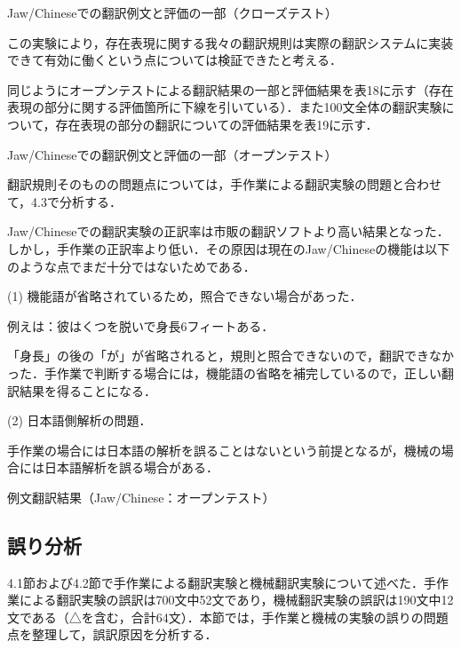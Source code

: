 \documentclass[japanese]{jnlp_1.4}
\begin{document}
\begin{table}[t]
\caption{Jaw/Chineseでの翻訳例文と評価の一部（クローズテスト）}

\end{table}


この実験により，存在表現に関する我々の翻訳規則は実際の翻訳システムに実装できて有効に働くという点については検証できたと考える．

同じようにオープンテストによる翻訳結果の一部と評価結果を表18に示す（存在表現の部分に関する評価箇所に下線を引いている）．また100文全体の翻訳実験について，存在表現の部分の翻訳についての評価結果を表19に示す．

\begin{table}[p]
\caption{Jaw/Chineseでの翻訳例文と評価の一部（オープンテスト）}

\end{table}


翻訳規則そのものの問題点については，手作業による翻訳実験の問題と合わせて，4.3で分析する．

Jaw/Chineseでの翻訳実験の正訳率は市販の翻訳ソフトより高い結果となった．しかし，手作業の正訳率より低い．その原因は現在のJaw/Chineseの機能は以下のような点でまだ十分ではないためである．

\noindent
(1) 機能語が省略されているため，照合できない場合があった．

例えは：彼はくつを脱いで身長6フィートある．

「身長」の後の「が」が省略されると，規則と照合できないので，翻訳できなかった．手作業で判断する場合には，機能語の省略を補完しているので，正しい翻訳結果を得ることになる．

\noindent
(2) 日本語側解析の問題．

手作業の場合には日本語の解析を誤ることはないという前提となるが，機械の場合には日本語解析を誤る場合がある．

\begin{table}[t]
\caption{例文翻訳結果（Jaw/Chinese：オープンテスト）}

\end{table}


\subsection{誤り分析}

4.1節および4.2節で手作業による翻訳実験と機械翻訳実験について述べた．手作業による翻訳実験の誤訳は700文中52文であり，機械翻訳実験の誤訳は190文中12文である（△を含む，合計64文）．本節では，手作業と機械の実験の誤りの問題点を整理して，誤訳原因を分析する．
\end{document}
